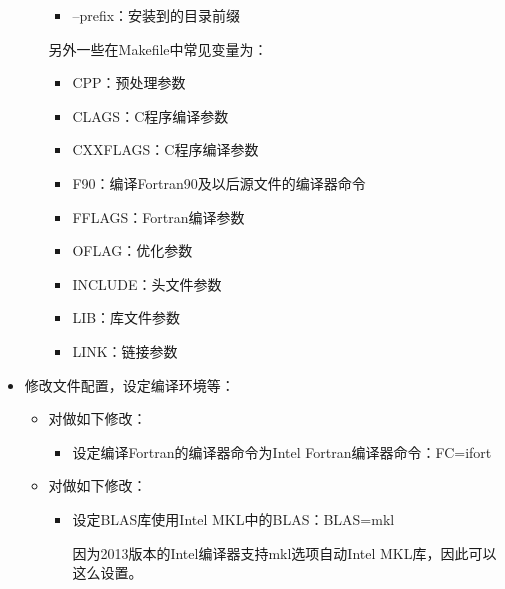\documentclass[a4paper,12pt,english]{sphinxmanual}
\begin{document}
\begin{itemize}
\begin{itemize}
\begin{itemize}
\item {} 
\sphinxAtStartPar
–prefix：安装到的目录前缀

\end{itemize}

\sphinxAtStartPar
另外一些在Makefile中常见变量为：
\begin{itemize}
\item {} 
\sphinxAtStartPar
CPP：预处理参数

\item {} 
\sphinxAtStartPar
CLAGS：C程序编译参数

\item {} 
\sphinxAtStartPar
CXXFLAGS：C程序编译参数

\item {} 
\sphinxAtStartPar
F90：编译Fortran90及以后源文件的编译器命令

\item {} 
\sphinxAtStartPar
FFLAGS：Fortran编译参数

\item {} 
\sphinxAtStartPar
OFLAG：优化参数

\item {} 
\sphinxAtStartPar
INCLUDE：头文件参数

\item {} 
\sphinxAtStartPar
LIB：库文件参数

\item {} 
\sphinxAtStartPar
LINK：链接参数

\end{itemize}

\end{itemize}

\item {} 
\sphinxAtStartPar
修改文件配置，设定编译环境等：
\begin{itemize}
\item {} 
\sphinxAtStartPar
对做如下修改：
\begin{itemize}
\item {} 
\sphinxAtStartPar
设定编译Fortran的编译器命令为Intel Fortran编译器命令：FC=ifort

\end{itemize}

\item {} 
\sphinxAtStartPar
对做如下修改：
\begin{itemize}
\item {} 
\sphinxAtStartPar
设定BLAS库使用Intel MKL中的BLAS：BLAS=\sphinxhyphen{}mkl %
\begin{footnote}[4]\sphinxAtStartFootnote
因为2013版本的Intel编译器支持\sphinxhyphen{}mkl选项自动Intel
MKL库，因此可以这么设置。
%
\end{footnote}


\end{itemize}
\end{itemize}
\end{itemize}
\end{document}
